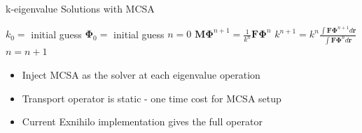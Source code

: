 \documentclass{beamer}
\begin{document}
\begin{frame}[fragile]{k-eigenvalue Solutions with MCSA}

  \begin{algorithm}[H]
    \caption{Power Iteration MCSA Scheme}
    \label{alg:power_iteration}
    \begin{algorithmic}
      \STATE $k_0 =$ initial guess
      \STATE $\mathbf{\Phi}_0 =$ initial guess
      \STATE $n = 0$
      \STATE $\mathbf{M} \mathbf{\Phi}^{n+1} = \frac{1}{k^n} \mathbf{F} \mathbf{\Phi}^n$
      \STATE $k^{n+1} = k^n \frac{\int \mathbf{F} \mathbf{\Phi}^{n+1} d\mathbf{r}}{\int
        \mathbf{F} \mathbf{\Phi}^n d\mathbf{r}}$
      \STATE $n = n+1$
      \ENDWHILE
    \end{algorithmic}
  \end{algorithm}

  \begin{itemize}
  \item Inject MCSA as the solver at each eigenvalue operation
    \medskip
  \item Transport operator is static - one time cost for MCSA setup
    \medskip
  \item Current Exnihilo implementation gives the full operator
  \end{itemize}

\end{frame}
\end{document}
